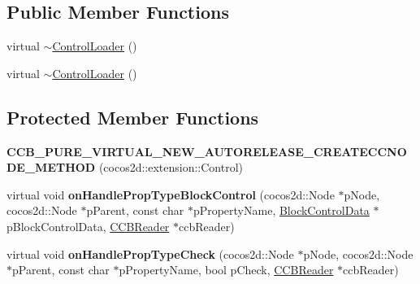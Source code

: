 \subsection*{Public Member Functions}
\begin{DoxyCompactItemize}
\item 
virtual \hyperlink{classcocosbuilder_1_1ControlLoader_adaea0700319b70e951a73dfb5b27c38e}{$\sim$\+Control\+Loader} ()
\item 
virtual \hyperlink{classcocosbuilder_1_1ControlLoader_adaea0700319b70e951a73dfb5b27c38e}{$\sim$\+Control\+Loader} ()
\end{DoxyCompactItemize}
\subsection*{Protected Member Functions}
\begin{DoxyCompactItemize}
\item 
\mbox{\label{classcocosbuilder_1_1ControlLoader_af2786f07965b638efa572b1dbc38fe77}} 
{\bfseries C\+C\+B\+\_\+\+P\+U\+R\+E\+\_\+\+V\+I\+R\+T\+U\+A\+L\+\_\+\+N\+E\+W\+\_\+\+A\+U\+T\+O\+R\+E\+L\+E\+A\+S\+E\+\_\+\+C\+R\+E\+A\+T\+E\+C\+C\+N\+O\+D\+E\+\_\+\+M\+E\+T\+H\+OD} (cocos2d\+::extension\+::\+Control)
\item 
\mbox{\label{classcocosbuilder_1_1ControlLoader_a0d4fd9e4c741221142c90c6a0e159153}} 
virtual void {\bfseries on\+Handle\+Prop\+Type\+Block\+Control} (cocos2d\+::\+Node $\ast$p\+Node, cocos2d\+::\+Node $\ast$p\+Parent, const char $\ast$p\+Property\+Name, \hyperlink{structcocosbuilder_1_1BlockControlData}{Block\+Control\+Data} $\ast$p\+Block\+Control\+Data, \hyperlink{classcocosbuilder_1_1CCBReader}{C\+C\+B\+Reader} $\ast$ccb\+Reader)
\item 
\mbox{\label{classcocosbuilder_1_1ControlLoader_ae82a763ab0cb75e6378ac573bde3d761}} 
virtual void {\bfseries on\+Handle\+Prop\+Type\+Check} (cocos2d\+::\+Node $\ast$p\+Node, cocos2d\+::\+Node $\ast$p\+Parent, const char $\ast$p\+Property\+Name, bool p\+Check, \hyperlink{classcocosbuilder_1_1CCBReader}{C\+C\+B\+Reader} $\ast$ccb\+Reader)
\item 
\mbox{\label{classcocosbuilder_1_1ControlLoader_af2786f07965b638efa572b1dbc38fe77}} 

\end{DoxyCompactItemize}
